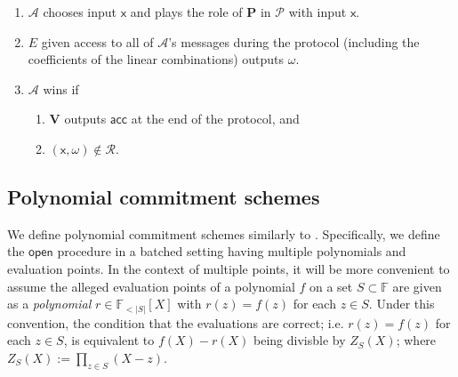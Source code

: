 \documentclass[11pt]{article} %
\newcommand{\F}{\ensuremath{\mathbb F}\xspace}
\newcommand{\adv}{\ensuremath{\mathcal A}\xspace}
\newcommand{\open}{\ensuremath{\mathsf{open}}\xspace}
\newcommand{\acc}{\ensuremath{\mathsf{acc}}\xspace}
\newcommand{\defeq}{:=}
\newcommand{\prv}{\ensuremath{\mathsf{\mathbf{P}}}\xspace}
\newcommand{\inp}{\ensuremath{\mathsf{x}}\xspace}
\newcommand{\wit}{\ensuremath{\omega}\xspace}
\newcommand{\ver}{\ensuremath{\mathsf{\mathbf{V}}}\xspace}
\newcommand{\rel}{\ensuremath{\mathcal{R}}\xspace}
\newcommand{\ext}{\ensuremath{E}\xspace}
\newcommand{\polysofdeg}[1]{\ensuremath{\F_{< #1}[X]}\xspace}
\newcommand{\prot}{\ensuremath{\mathscr{P}}\xspace}
\begin{document}
\begin{enumerate}
 \item \adv chooses input \inp and plays the role of \prv in \prot with input \inp.
 \item \ext given access to all of \adv's messages during the protocol (including the coefficients of the linear combinations) outputs \wit.
 \item \adv wins if
 \begin{enumerate}
  \item \ver outputs \acc at the end of the protocol, and
  \item $(\inp,\wit)\notin \rel$.
 \end{enumerate}

\end{enumerate}

\subsection{Polynomial commitment schemes}\label{subsec:PCS}
We define polynomial commitment schemes similarly to \cite{plonk}.
Specifically, we define the \open procedure in a batched setting having multiple polynomials and evaluation points.
In the context of multiple points, it will be more convenient to assume the alleged evaluation points 
of a polynomial $f$ on a set $S\subset \F$  are given as a \emph{polynomial} $r\in \polysofdeg{|S|}$ with
$r(z)=f(z)$ for each $z\in S$. Under this convention, the condition that the evaluations are correct; i.e. $r(z)=f(z)$ for each $z\in S$, is equivalent to $f(X)-r(X)$ being divisble by $Z_S(X)$;
where $Z_S(X)\defeq \prod_{z\in S} (X-z)$.
\end{document}
